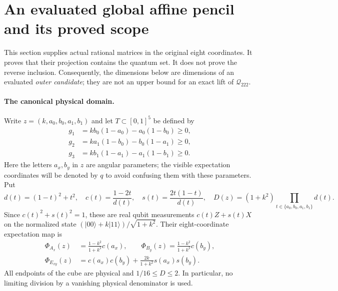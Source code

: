 \section{An evaluated global affine pencil and its proved scope}
\label{sec:c160-global}

This section supplies actual rational matrices in the original eight
coordinates.  It proves that their projection contains the quantum set.
It does not prove the reverse inclusion.  Consequently, the dimensions
below are dimensions of an evaluated \emph{outer candidate}; they are not
an upper bound for an exact lift of $\mathcal Q_{222}$.

\paragraph{The canonical physical domain.}
Write $z=(k,a_0,b_0,a_1,b_1)$ and let $T\subset[0,1]^5$ be defined by
\[
\begin{split}
 g_1&=kb_0(1-a_0)-a_0(1-b_0)\ge0,\\
 g_2&=ka_1(1-b_0)-b_0(1-a_1)\ge0,\\
 g_3&=kb_1(1-a_1)-a_1(1-b_1)\ge0.
\end{split}\tag{CC1}
\]
Here the letters $a_x,b_y$ in $z$ are angular parameters; the visible
expectation coordinates will be denoted by $q$ to avoid confusing them
with these parameters.  Put
\[
 d(t)=(1-t)^2+t^2,\quad c(t)=\frac{1-2t}{d(t)},\quad
 s(t)=\frac{2t(1-t)}{d(t)},\quad
 D(z)=(1+k^2)\prod_{t\in\{a_0,b_0,a_1,b_1\}}d(t).
\tag{CC2}
\]
Since $c(t)^2+s(t)^2=1$, these are real qubit measurements
$c(t)Z+s(t)X$ on the normalized state
$(|00\rangle+k|11\rangle)/\sqrt{1+k^2}$.
Their eight-coordinate expectation map is
\[
\begin{split}
 \Phi_{A_x}(z)&=\frac{1-k^2}{1+k^2}c(a_x),\qquad
 \Phi_{B_y}(z)=\frac{1-k^2}{1+k^2}c(b_y),\\
 \Phi_{E_{xy}}(z)&=c(a_x)c(b_y)+\frac{2k}{1+k^2}s(a_x)s(b_y).
\end{split}\tag{CC3}
\]
All endpoints of the cube are physical and
$1/16\le D\le2$.  In particular, no limiting division by a vanishing
physical denominator is used.

